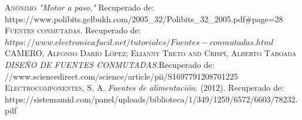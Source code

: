 \documentclass[letterpaper]{article}
\begin{document}
\newpage
    \begin{thebibliography}{x}
         \textsc{Anónimo} \textit{"Motor a paso."} Recuperado de:\\ 
        https://www.polibits.gelbukh.com/2005\_32/Polibits\_32\_2005.pdf\#page=28
         \textsc{Fuentes conmutadas.} Recuperado de:\\
        $https://www.electronicafacil.net/tutoriales/Fuentes-conmutadas.html$
         \textsc{CAMERO, Alfonso Darío López; Elianny Treto and Crispí, Alberto Taboada} \textit{DISEÑO DE FUENTES CONMUTADAS.}Recuperado de:\\ //www.sciencedirect.com/science/article/pii/S1697791208701225 
         \textsc{Electrocomponentes, S. A.} \textit{Fuentes de alimentación.} (2012). Recuperado de:\\ https://sistemamid.com/panel/uploads/biblioteca/1/349/1259/6572/6603/78232.pdf 
\end{thebibliography}
\end{document}

